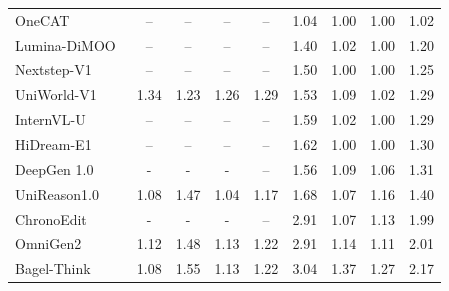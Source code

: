 \begin{table}[t]
{\begin{tabular}{l|cccc|cccc}
            \midrule
            OneCAT~\cite{li2025onecat}
            & -- & -- & -- & --
            & 1.04 & 1.00 & 1.00
            & \cellcolor[HTML]{C8C8C8}1.02 \\

            Lumina-DiMOO~\cite{xin2025lumina}
            & -- & -- & -- & --
            & 1.40 & 1.02 & 1.00
            & \cellcolor[HTML]{C8C8C8}1.20 \\

            Nextstep-V1~\cite{han2025nextstep}
            & -- & -- & -- & --
            & 1.50 & 1.00 & 1.00
            & \cellcolor[HTML]{C8C8C8}1.25 \\

            UniWorld-V1~\cite{lin2025uniworld}
            & 1.34 & 1.23 & 1.26 & \cellcolor[HTML]{C8C8C8}1.29 & 1.53 & 1.09 & 1.02
            & \cellcolor[HTML]{C8C8C8}1.29 \\

            InternVL-U~\cite{tian2026internvl}
            & -- & -- & -- & --
            & 1.59 & 1.02 & 1.00
            & \cellcolor[HTML]{C8C8C8}1.29 \\

            

            HiDream-E1~\cite{cai2025hidream}
            & -- & -- & -- & --
            & 1.62 & 1.00 & 1.00
            & \cellcolor[HTML]{C8C8C8}1.30 \\

            DeepGen 1.0~\cite{wang2026deepgen}
            & - & - & - & --
            & 1.56 & 1.09 & 1.06
            & \cellcolor[HTML]{C8C8C8}1.31 \\

            UniReason1.0~\cite{wang2026unireason}
            & 1.08 & 1.47 & 1.04 & \cellcolor[HTML]{C8C8C8}1.17 & 1.68 & 1.07 & 1.16
            & \cellcolor[HTML]{C8C8C8}1.40 \\

            ChronoEdit~\cite{wu2025chronoedit}
            & - & - & - & --
            & 2.91 & 1.07 & 1.13
            & \cellcolor[HTML]{C8C8C8}1.99 \\

            OmniGen2~\cite{wu2025omnigen2}
            & 1.12 & 1.48 & 1.13 & \cellcolor[HTML]{C8C8C8}1.22 & 2.91 & 1.14 & 1.11
            & \cellcolor[HTML]{C8C8C8}2.01 \\


            Bagel-Think~\cite{deng2025emerging}
            & 1.08 & 1.55 & 1.13 & \cellcolor[HTML]{C8C8C8}1.22 & 3.04 & 1.37 & 1.27
            & \cellcolor[HTML]{C8C8C8}2.17 \\


\end{tabular}}
\end{table}
